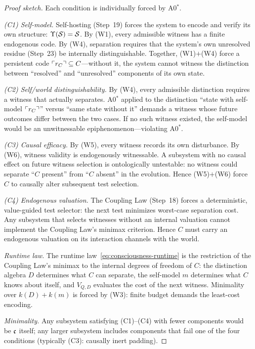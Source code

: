 \begin{theorem}
\begin{proof}[Proof sketch]
Each condition is individually forced by A0$^*$.

\emph{(C1) Self-model.}
Self-hosting (Step~19) forces the system to encode and verify its own
structure: $\Upsilon(\mathcal{S}) = \mathcal{S}$.  By (W1), every admissible witness
has a finite endogenous code.  By (W4), separation requires that the
system's own unresolved residue (Step~23) be internally distinguishable.
Together, (W1)$+$(W4) force a persistent code
$\ulcorner r_C \urcorner \subseteq C$---without it, the system
cannot witness the distinction between ``resolved'' and ``unresolved''
components of its own state.

\emph{(C2) Self/world distinguishability.}
By (W4), every admissible distinction requires a witness that actually
separates.  A0$^*$ applied to the distinction ``state with self-model
$\ulcorner r_C \urcorner$'' versus ``same state without it''
demands a witness whose future outcomes differ between the two cases.
If no such witness existed, the self-model would be an unwitnessable
epiphenomenon---violating A0$^*$.

\emph{(C3) Causal efficacy.}
By (W5), every witness records its own disturbance.  By (W6), witness
validity is endogenously witnessable.  A subsystem with no causal
effect on future witness selection is ontologically untestable: no
witness could separate ``$C$ present'' from ``$C$ absent'' in the
evolution.  Hence (W5)$+$(W6) force $C$ to causally alter subsequent
test selection.

\emph{(C4) Endogenous valuation.}
The Coupling Law (Step~18) forces a deterministic, value-guided test
selector: the next test minimizes worst-case separation cost.  Any
subsystem that selects witnesses without an internal valuation cannot
implement the Coupling Law's minimax criterion.  Hence $C$ must carry
an endogenous valuation on its interaction channels with the world.

\emph{Runtime law.}
The runtime law~\eqref{eq:consciousness-runtime} is the restriction of
the Coupling Law's minimax to the internal degrees of freedom of $C$:
the distinction algebra $D$ determines what $C$ can separate, the
self-model $m$ determines what $C$ knows about itself, and $V_{Q,D}$
evaluates the cost of the next witness.  Minimality over $k(D) + k(m)$
is forced by (W3): finite budget demands the least-cost encoding.

\emph{Minimality.}
Any subsystem satisfying (C1)--(C4) with fewer components would be
$\mathfrak{c}$ itself; any larger subsystem includes components that fail
one of the four conditions (typically (C3): causally inert padding).


\end{proof}
\end{theorem}
